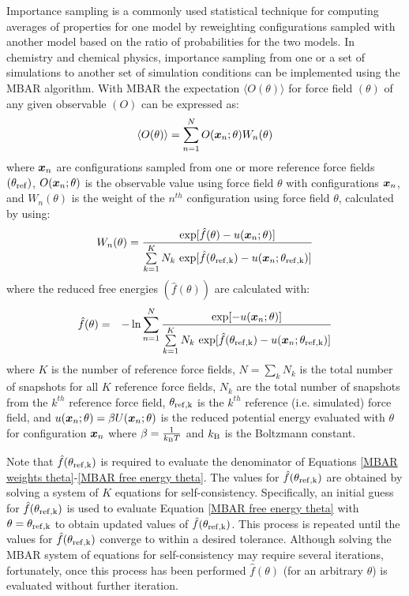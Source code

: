 \documentclass[11pt,a4paper]{article}
\newcommand{\bfv}[1]{{\mbox{\boldmath{$#1$}}}}
\newcommand{\x}{\bfv{x}}
\begin{document}
Importance sampling is a commonly used statistical technique for computing averages of properties for one model by reweighting configurations sampled with another model based on the ratio of probabilities for the two models. In chemistry and chemical physics, importance sampling from one or a set of simulations to another set of simulation conditions can be implemented using the MBAR algorithm.\cite{shirts-chodera:jcp:2008:mbar,arxivShirts2017}
With MBAR the expectation $\langle O(\theta) \rangle$ for force field $(\theta)$ of any given observable $(O)$ can be expressed as:
\begin{eqnarray} \label{MBAR O theta}
\langle O(\theta)\rangle = \sum_{n=1}^{N} O(\x_{n};\theta) W_{n}(\theta)
\end{eqnarray}
where $\x_n$ are configurations sampled from one or more reference force fields $(\theta_{\rm ref})$, 
$O(\x_{n};\theta)$ is the observable value using force field 
$\theta$ with configurations $\x_n$, and $W_{n}(\theta)$ is the weight of the $n^{th}$
configuration using force field $\theta$, calculated by using:
\begin{eqnarray} \label{MBAR weights theta}
W_{n}(\theta) = \frac{\exp[\hat{f}(\theta)-u(\x_{n};\theta)]}{\sum\limits_{k=1}^K N_k \, \exp[\hat{f}(\theta_{\rm ref,k}) - u(\x_{n};\theta_{\rm ref,k})]}
\end{eqnarray}
where the reduced free energies $(\hat f(\theta))$ are calculated with:
\begin{eqnarray} \label{MBAR free energy theta}
\hat f(\theta) &=& - \ln \sum_{n=1}^{N}
\frac{\exp[-u(\x_{n};\theta)]}{\sum\limits_{k=1}^K N_k \, \exp[\hat{f}(\theta_{\rm ref,k}) - u(\x_{n};\theta_{\rm ref,k})]} \label{equation:estimator-of-free-energies}
\end{eqnarray}
where $K$ is the number of reference force fields, $N = \sum_k N_k$ is the total number of snapshots for all $K$ reference force fields, $N_k$ are the total number of snapshots from the $k^{th}$ reference force field, $\theta_{\rm ref,k}$ is the $k^{th}$ reference (i.e. simulated) force field, and $u(\x_{n};\theta) = \beta U(\x_n;\theta)$ is the reduced potential energy evaluated with $\theta$ for configuration $\x_n$  where $\beta = \frac{1}{k_{\rm B}T}$ and $k_{\rm B}$ is the Boltzmann constant. 

Note that $\hat f(\theta_{\rm ref,k})$ is required to evaluate the denominator of Equations \ref{MBAR weights theta}-\ref{MBAR free energy theta}. The values for $\hat f(\theta_{\rm ref,k})$ are obtained by solving a system of $K$ equations for self-consistency. Specifically, an initial guess for $\hat f(\theta_{\rm ref,k})$ is used to evaluate Equation \ref{MBAR free energy theta} with $\theta=\theta_{\rm ref,k}$ to obtain updated values of $\hat f(\theta_{\rm ref,k})$. This process is repeated until the values for $\hat f(\theta_{\rm ref,k})$ converge to within a desired tolerance. Although solving the MBAR system of equations for self-consistency may require several iterations, fortunately, once this process has been performed $\hat f(\theta)$ (for an arbitrary $\theta$) is evaluated without further iteration.
\end{document}
